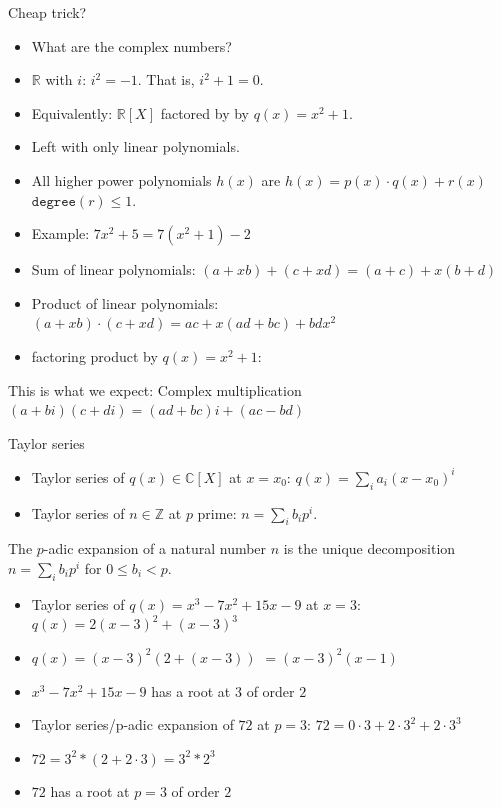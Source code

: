 \documentclass[8pt]{beamer}
\newcommand{\Z}{\mathbb Z}
\newcommand{\C}{\mathbb C}
\newcommand{\degree}{\texttt{degree}}
\begin{document}
\begin{frame}[fragile]{Cheap trick?}

\begin{itemize}
\item What are the complex numbers? \pause
\item $\mathbb R$ with $i$: $i^2 = -1$. \pause That is, $i^2 + 1 = 0$. \pause
\item Equivalently: $\mathbb R[X]$ \pause factored by by $q(x) = x^2 + 1$. \pause
\item Left with only linear polynomials. \pause
\item All higher power polynomials $h(x)$  are $h(x) = p(x) \cdot q(x) + r(x)$ \pause $\degree(r) \leq 1$. \pause
\item Example: $7x^2 + 5 = 7(x^2 + 1) - 2$ \pause
\item Sum of linear polynomials: $(a + xb) + (c + xd) = (a + c) + x(b + d) $\pause
\item Product of linear polynomials: $(a + xb) \cdot (c + xd) = ac + x(ad + bc) + bdx^2$ \pause
\item factoring product by $q(x) = x^2 + 1$:
\end{itemize}

 \pause

\begin{block}{This is what we expect: Complex multiplication}
$(a + bi) (c + di) = (ad + bc) i + (ac - bd)$
\end{block}
\end{frame}

\begin{frame}{Taylor series}

\begin{itemize}
\item Taylor series of $q(x) \in \C[X]$ at $x = x_0$: $q(x) = \sum_i a_i (x - x_0)^i$ \pause
\item Taylor series of $n \in \Z$ at $p$ prime: $n = \sum_i b_i p^i$. \pause
\end{itemize}
\begin{definition}
The $p$-adic expansion of a natural number $n$ is
the unique decomposition $n = \sum_i b_i p^i$ for $0 \leq b_i < p$.
\end{definition}

\begin{itemize}
\item Taylor series of $q(x) = x^3 - 7x^2 + 15x - 9$  \pause at $x = 3$: \pause $q(x) =  2(x - 3)^2 + (x - 3)^3$ \pause
\item $q(x) = (x-3)^2(2 + (x-3))$ \pause $ = (x-3)^2(x-1)$ \pause
\item $x^3 - 7x^2 + 15x - 9$ has a root at $3$ of order $2$ \pause

\item Taylor series/p-adic expansion of $72$ at $p = 3$: \pause $72 = 0 \cdot 3 + 2 \cdot 3^2 + 2 \cdot 3^3$ \pause
\item $72 = 3^2 * (2 + 2 \cdot 3) = 3^2 * 2^3$ \pause
\item $72$ has a root at $p=3$ of order $2$ \pause
\end{itemize}
\end{frame}
\end{document}
